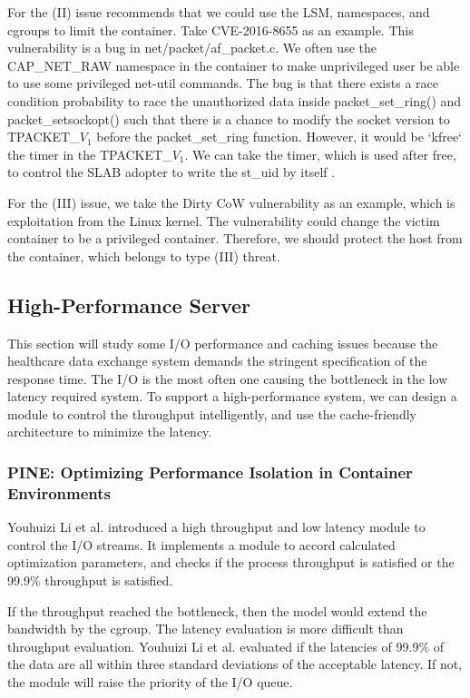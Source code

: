 \documentclass[12pt,a4paper]{article}
\begin{document}
For the (\RN{2}) issue \cite{Road_Ahead} recommends that we could use the
LSM, namespaces, and cgroups to limit the container. Take CVE-2016-8655 \cite{CVE-2016-8655,Measurement}
as an example. This vulnerability is a bug in net/packet/af\_packet.c. We often use the
CAP\_NET\_RAW namespace in the container to make unprivileged user be able to use some privileged
net-util commands. The bug is that there exists a race condition probability to race the unauthorized
data inside packet\_set\_ring() and packet\_setsockopt() \cite{CVE-2016-8655-lwn} such that
there is a chance to modify the socket version to TPACKET\_$V_1$ before the packet\_set\_ring
function. However, it would be `kfree` the timer in the TPACKET\_$V_1$. We can take the timer,
which is used after free, to control the SLAB adopter to write the st\_uid by itself
\cite{AF_PACKET}.

For the (\RN{3}) issue, we take the Dirty CoW vulnerability as an example, which is exploitation
from the Linux kernel. The vulnerability could change the victim container to be a privileged
container. Therefore, we should protect the host from the container, which belongs to type
(\RN{3}) threat.

\subsection{High-Performance Server}
\hypertarget{heigh_performance}{}
This section will study some I/O performance and caching issues because the healthcare
data exchange system demands the stringent specification of the response time.
The I/O is the most often one causing the bottleneck in the low latency required system.
To support a high-performance system, we can design a module to control the throughput
intelligently, and use the cache-friendly architecture to minimize the latency.

\subsubsection{PINE: Optimizing Performance Isolation in Container Environments}
Youhuizi Li et al. \cite{Optimizing} introduced a high throughput and low latency module to control
the I/O streams. It implements a module to accord calculated optimization parameters,
and checks if the process throughput is satisfied or the 99.9\% throughput is satisfied.

If the throughput reached the bottleneck, then the model would extend the
bandwidth by the cgroup. The latency evaluation is more difficult than throughput
evaluation. Youhuizi Li et al. \cite{Optimizing} evaluated if the latencies of 99.9\% of the
data are all within three standard deviations of the acceptable latency. If not,
the module will raise the priority of the I/O queue.
\end{document}
